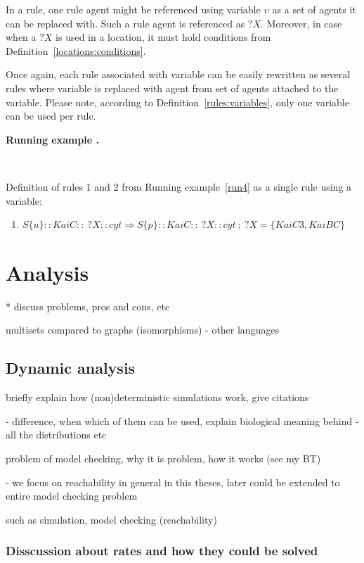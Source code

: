 \documentclass[12pt]{fithesis2}
\newcounter{counter}[section]
\renewcommand{\thecounter}{\thesection.\arabic{counter}}
\newenvironment{runningExample}{\medskip\refstepcounter{counter}\textbf{Running example \thecounter}\par\nopagebreak\noindent}{\medskip}
\begin{document}
In a rule, one rule agent might be referenced using variable $\upsilon$ as a set of agents it can be replaced with. Such a rule agent is referenced as $?X$. Moreover, in case when a $?X$ is used in a location, it must hold conditions from Definition~\ref{locations:conditions}.

Once again, each rule associated with variable can be easily rewritten as several rules where variable is replaced with agent from set of agents attached to the variable. Please note, according to Definition~\ref{rules:variables}, only one variable can be used per rule.

\begin{runningExample}\label{run5}
$ $

\noindent Definition of rules 1 and 2 from Running example~\ref{run4} as a single rule using a variable:
\begin{enumerate}
\item $S\{u\}::KaiC::~?X::cyt \Rightarrow S\{p\}::KaiC::~?X::cyt ~;~ ?X = \{KaiC3, KaiBC\} $
\end{enumerate}
\end{runningExample}


\chapter{Analysis}

* discuss problems, pros and cons, etc

multisets compared to graphs (isomorphisms) - other languages

\section{Dynamic analysis}

briefly explain how (non)deterministic simulations work, give citations

 - difference, when which of them can be used, explain biological meaning behind
 - all the distributions etc

problem of model checking, why it is problem, how it works (see my BT) 

 - we focus on reachability in general in this theses, later could be extended to entire model checking problem

such as simulation, model checking (reachability)

\subsection{Disscussion about rates and how they could be solved}
\end{document}
